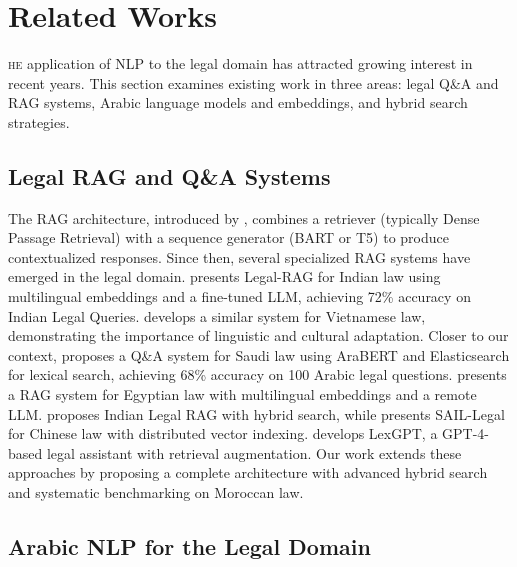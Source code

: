 \section{Related Works}

\lettrine[lines=2]{\color{titleblue}{T}}{he} application of NLP to the legal
domain has attracted growing interest in recent years. This section examines
existing work in three areas: legal Q\&A and RAG systems, Arabic language
models and embeddings, and hybrid search strategies.

\subsection{Legal RAG and Q\&A Systems}

The RAG architecture, introduced by \cite{lewis2020retrieval}, combines a
retriever (typically Dense Passage Retrieval) with a sequence generator
(BART or T5) to produce contextualized responses. Since then, several
specialized RAG systems have emerged in the legal domain.
\cite{louis2023legal} presents Legal-RAG for Indian law using multilingual
embeddings and a fine-tuned LLM, achieving 72\% accuracy on Indian Legal
Queries. \cite{nguyen2023vietnamese} develops a similar system for
Vietnamese law, demonstrating the importance of linguistic and cultural
adaptation. Closer to our context, \cite{alshareef2023arabic} proposes a
Q\&A system for Saudi law using AraBERT and Elasticsearch for lexical
search, achieving 68\% accuracy on 100 Arabic legal questions.
\cite{elaraby2024legal} presents a RAG system for Egyptian law with
multilingual embeddings and a remote LLM. \cite{sharma2024indian} proposes
Indian Legal RAG with hybrid search, while \cite{huang2024sail} presents
SAIL-Legal for Chinese law with distributed vector indexing.
\cite{zhou2023lexgpt} develops LexGPT, a GPT-4-based legal assistant with
retrieval augmentation. Our work extends these approaches by proposing a
complete architecture with advanced hybrid search and systematic
benchmarking on Moroccan law.

\subsection{Arabic NLP for the Legal Domain}

